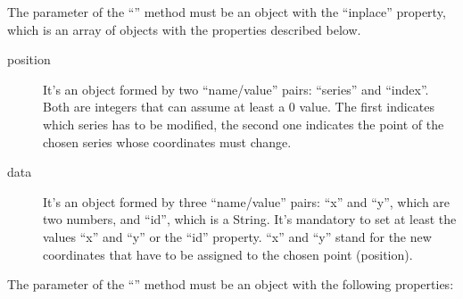 				The parameter of the “” method must be an object with the “inplace” property, which is an array of objects with the properties described below.
				\begin{description}
					\item[position] It's an object formed by two “name/value” pairs: “series” and “index”. Both are integers that can assume at least a 0 value. The first indicates which series has to be modified, the second one indicates the point of the chosen series whose coordinates must change. 
					\item[data] It's an object formed by three “name/value” pairs: “x” and “y”, which are two numbers, and “id”, which is a String. It's mandatory to set at least the values “x” and “y” or the “id” property. “x” and “y” stand for the new coordinates that have to be assigned to the chosen point (position).
				\end{description}
				The parameter of the “” method must be an object with the following properties:
